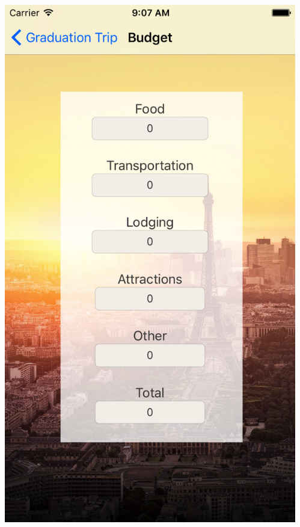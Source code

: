 \documentclass{beamer}
\begin{document}
\begin{frame}
\begin{columns}
\begin{column}{0.3\textwidth}
\begin{center}
        \end{center}
    \end{column}
    \begin{column}{0.3\textwidth}  %
        \begin{center}
            \includegraphics[scale=0.14]{budget}
        \end{center}
    \end{column}
\end{columns}
\end{frame}
\end{document}
